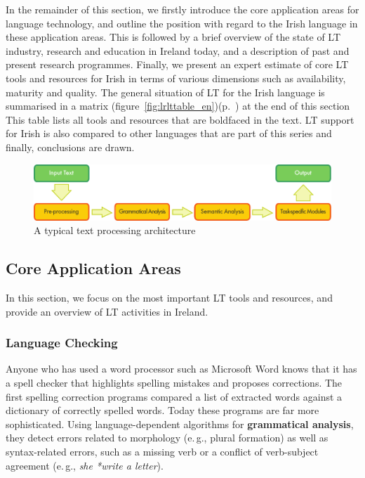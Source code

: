 \begin{multicols}{2}

In the remainder of this section, we firstly introduce the core application areas for language technology, and outline the position with regard to the Irish language in these application areas. This is followed by a brief overview of the state of LT industry, research and education in Ireland today, and a description of past and present research programmes. Finally, we present an expert estimate of core LT tools and resources for Irish in terms of various dimensions such as availability, maturity and quality. The general situation of LT for the Irish language is summarised in a matrix (figure~\ref{fig:lrlttable_en})(p.~\pageref{fig:lrlttable_en}) at the end of this section This table lists all tools and resources that are boldfaced in the text. LT support for Irish is also compared to other languages that are part of this series and finally, conclusions are drawn.

\begin{figure}[htb]
  \center
  \includegraphics[width=\textwidth]{../_media/english/text_processing_app_architecture}
  \caption{A typical text processing architecture}
  \label{fig:textprocessingarch_en}
\end{figure}

\subsection{Core Application Areas}

In this section, we focus on the most important LT tools and resources, and provide an overview of LT activities in Ireland.

\subsubsection{Language Checking}

Anyone who has used a word processor such as Microsoft Word knows that it has a spell checker that highlights spelling mistakes and proposes corrections. The first spelling correction programs compared a list of extracted words against a dictionary of correctly spelled words. Today these programs are far more sophisticated. Using language-dependent algorithms for \textbf{grammatical analysis}, they detect errors related to morphology (e.\,g., plural formation) as well as syntax-related errors, such as a missing verb or a conflict of verb-subject agreement (e.\,g., \textit{she *write a letter}). 


\end{multicols}

